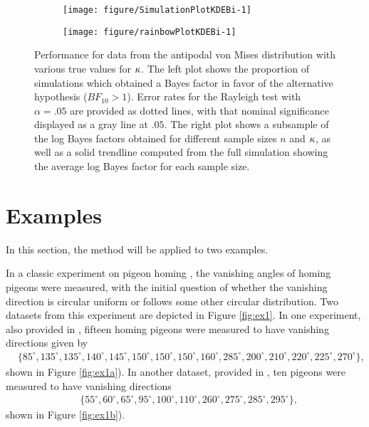 \begin{figure}
  \begin{subfigure}[t]{0.5\linewidth}\centering
\begin{knitrout}
\color{fgcolor}
\texttt{[image: figure/SimulationPlotKDEBi-1]} 

\end{knitrout}
    \caption{}\label{fig:simKDEBierror}
  \end{subfigure}%
  \begin{subfigure}[t]{0.5\linewidth}\centering
\begin{knitrout}
\color{fgcolor}
\texttt{[image: figure/rainbowPlotKDEBi-1]} 

\end{knitrout}
    \caption{}\label{fig:simKDEBibfs}
  \end{subfigure}
  \caption{Performance for data from the antipodal von Mises distribution with various true values for \( \kappa \). The left plot shows the proportion of simulations which obtained a Bayes factor in favor of the alternative hypothesis (\(BF_{10} > 1\)). Error rates for the Rayleigh test with \(\alpha = .05\) are provided as dotted lines, with that nominal significance displayed as a gray line at \(.05\). The right plot shows a subsample of the log Bayes factors obtained for different sample sizes \(n\) and \(\kappa\), as well as a solid trendline computed from the full simulation showing the average log Bayes factor for each sample size.}\label{fig:simKDEBi}
\end{figure}



\section{Examples} \label{sec:ex}
In this section, the method will be applied to two examples. 




In a classic experiment on pigeon homing \citep{schmidt1963role}, the vanishing angles of homing pigeons were measured, with the initial question of whether the vanishing direction is circular uniform or follows some other circular distribution. Two datasets from this experiment are depicted in Figure \ref{fig:ex1}. In one experiment, also provided in \citet{fisher1995statistical}, fifteen homing pigeons were measured to have vanishing directions given by 
\begin{align}
&\{ 85^\circ, 135^\circ, 135^\circ, 140^\circ, 145^\circ, 150^\circ, 150^\circ, 150^\circ, 160^\circ, 285^\circ, 200^\circ, 210^\circ, 220^\circ, 225^\circ, 270^\circ \},
\end{align} 
shown in Figure \ref{fig:ex1a}). In another dataset, provided in \citet{mardia2009directional}, ten pigeons were measured to have vanishing directions 
\begin{align}
&\{ 55^\circ, 60^\circ, 65^\circ, 95^\circ, 100^\circ, 110^\circ, 260^\circ, 275^\circ, 285^\circ, 295^\circ\},
\end{align} 
 shown in Figure \ref{fig:ex1b}).

